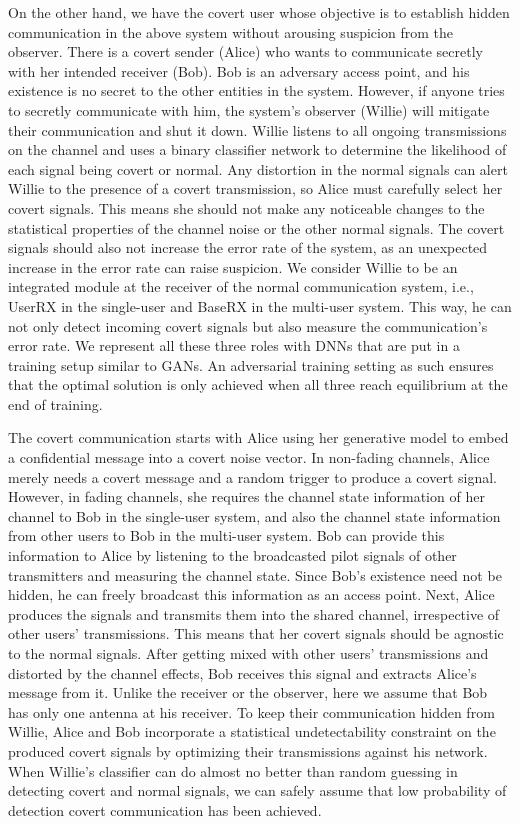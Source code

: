 On the other hand, we have the covert user whose objective is to establish hidden communication in the above system without arousing suspicion from the observer. There is a covert sender (Alice) who wants to communicate secretly with her intended receiver (Bob). Bob is an adversary access point, and his existence is no secret to the other entities in the system. However, if anyone tries to secretly communicate with him, the system's observer (Willie) will mitigate their communication and shut it down. Willie listens to all ongoing transmissions on the channel and uses a binary classifier network to determine the likelihood of each signal being covert or normal. Any distortion in the normal signals can alert Willie to the presence of a covert transmission, so Alice must carefully select her covert signals. This means she should not make any noticeable changes to the statistical properties of the channel noise or the other normal signals. The covert signals should also not increase the error rate of the system, as an unexpected increase in the error rate can raise suspicion. We consider Willie to be an integrated module at the receiver of the normal communication system, i.e., UserRX in the single-user and BaseRX in the multi-user system. This way, he can not only detect incoming covert signals but also measure the communication's error rate. We represent all these three roles with DNNs that are put in a training setup similar to GANs. An adversarial training setting as such ensures that the optimal solution is only achieved when all three reach equilibrium at the end of training.

The covert communication starts with Alice using her generative model to embed a confidential message into a covert noise vector. In non-fading channels, Alice merely needs a covert message and a random trigger to produce a covert signal. However, in fading channels, she requires the channel state information of her channel to Bob in the single-user system, and also the channel state information from other users to Bob in the multi-user system. Bob can provide this information to Alice by listening to the broadcasted pilot signals of other transmitters and measuring the channel state. Since Bob's existence need not be hidden, he can freely broadcast this information as an access point. Next, Alice produces the signals and transmits them into the shared channel, irrespective of other users' transmissions. This means that her covert signals should be agnostic to the normal signals. After getting mixed with other users' transmissions and distorted by the channel effects, Bob receives this signal and extracts Alice's message from it. Unlike the receiver or the observer, here we assume that Bob has only one antenna at his receiver. To keep their communication hidden from Willie, Alice and Bob incorporate a statistical undetectability constraint on the produced covert signals by optimizing their transmissions against his network. When Willie's classifier can do almost no better than random guessing in detecting covert and normal signals, we can safely assume that low probability of detection covert communication has been achieved.

